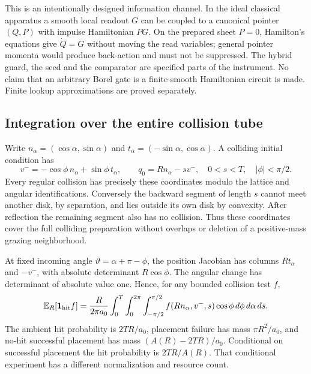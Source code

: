This is an intentionally designed information channel. In the ideal classical apparatus a smooth local readout $G$ can be coupled to a canonical pointer $(Q,P)$ with impulse Hamiltonian $PG$. On the prepared sheet $P=0$, Hamilton's equations give $\dot Q=G$ without moving the read variables; general pointer momenta would produce back-action and must not be suppressed. The hybrid guard, the seed and the comparator are specified parts of the instrument. No claim that an arbitrary Borel gate is a finite smooth Hamiltonian circuit is made. Finite lookup approximations are proved separately.

\subsection{Integration over the entire collision tube}
Write $n_\alpha=(\cos\alpha,\sin\alpha)$ and $t_\alpha=(-\sin\alpha,\cos\alpha)$. A colliding initial condition has
\[
 v^-=-\cos\phi\,n_\alpha+\sin\phi\,t_\alpha,
 \qquad q_0=Rn_\alpha-sv^-,\quad 0<s<T,\quad |\phi|<\pi/2.
\]
Every regular collision has precisely these coordinates modulo the lattice and angular identifications. Conversely the backward segment of length $s$ cannot meet another disk, by separation, and lies outside its own disk by convexity. After reflection the remaining segment also has no collision. Thus these coordinates cover the full colliding preparation without overlaps or deletion of a positive-mass grazing neighborhood.

At fixed incoming angle $\vartheta=\alpha+\pi-\phi$, the position Jacobian has columns $Rt_\alpha$ and $-v^-$, with absolute determinant $R\cos\phi$. The angular change has determinant of absolute value one. Hence, for any bounded collision test $f$,
\begin{equation}
 \mathbb E_R[\mathbf1_{\mathrm{hit}}f]
 =\frac{R}{2\pi a_0}\int_0^T\int_0^{2\pi}\int_{-\pi/2}^{\pi/2}
 f(Rn_\alpha,v^-,s)\cos\phi\,d\phi\,d\alpha\,ds.
 \label{eq:tube}
\end{equation}
The ambient hit probability is $2TR/a_0$, placement failure has mass $\pi R^2/a_0$, and no-hit successful placement has mass $(A(R)-2TR)/a_0$. Conditional on successful placement the hit probability is $2TR/A(R)$. That conditional experiment has a different normalization and resource count.

